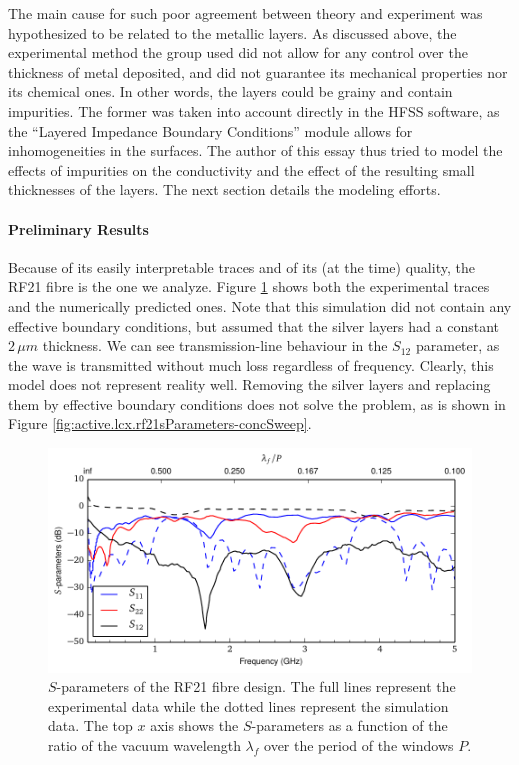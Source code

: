 The main cause for such poor agreement between theory and experiment
was hypothesized to be related to the metallic layers. As discussed
above, the experimental method the group used did not allow for any
control over the thickness of metal deposited, and did not guarantee
its mechanical properties nor its chemical ones. In other words, 
the layers could be grainy and contain impurities. The former was taken
into account directly in the HFSS software, as the ``Layered Impedance
Boundary Conditions'' module allows for inhomogeneities in the surfaces.
The author of this essay thus tried to model the effects of impurities 
on the conductivity and the effect of the resulting small thicknesses
of the layers. The next section details the modeling efforts.  

\paragraph{Preliminary Results}
Because of its easily interpretable traces and of its (at the time)
quality, the RF21 fibre is the one we analyze. Figure
\ref{fig:active.lcx.rf21sParameters-sim} shows both the experimental traces
and the numerically predicted ones. Note that this simulation did not contain
any effective boundary conditions, but assumed that the silver layers had a 
constant $2\,\unit{\mu m}$ thickness. We can see transmission-line behaviour
in the $S_{12}$ parameter, as the wave is transmitted without much loss
regardless of frequency. Clearly, this model does not represent reality
well. Removing the silver layers and replacing them by effective boundary
conditions does not solve the problem, as is shown in Figure 
\ref{fig:active.lcx.rf21sParameters-concSweep}. 

\begin{figure}
 \centering
 \includegraphics[width=\textwidth]{figs/active/sParametersRF21.pdf}
 \caption[$S$-parameters of the RF21 fibre design]
 		{$S$-parameters of the RF21 fibre design. The full lines represent
	  	the experimental data while the dotted lines represent the simulation data.
	  	The top $x$ axis shows the $S$-parameters as a function of the ratio of the 
	  	vacuum wavelength $\lambda_f$ over the period of the windows $P$.}
 \label{fig:active.lcx.rf21sParameters-sim}
\end{figure}

